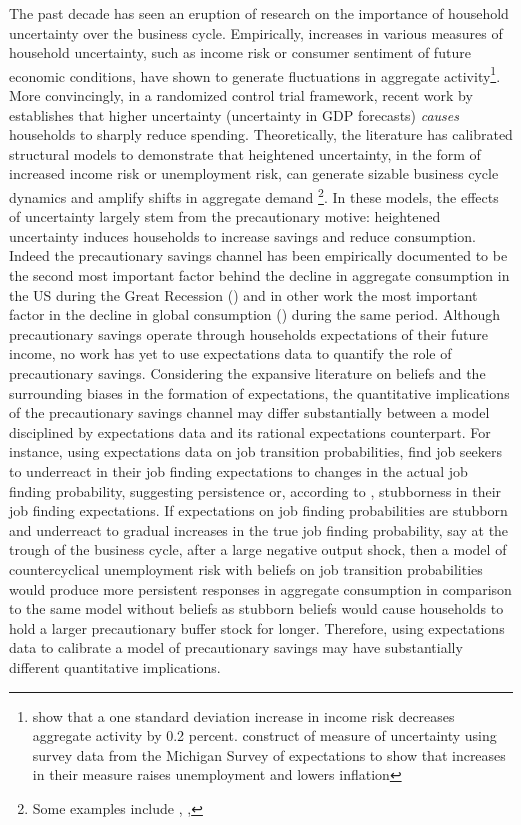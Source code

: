 \documentclass[titlepage]{\econtex}\providecommand{\texname}{Dissertation-Proposal}
\begin{document}
The past decade has seen an eruption of research on the importance of household uncertainty over the business cycle. Empirically, increases in various measures of household uncertainty, such as income risk or consumer sentiment of future economic conditions, have shown to generate fluctuations in aggregate activity\footnote{\cite{bayer2019precautionary} show that a one standard deviation increase in income risk decreases aggregate activity by 0.2 percent.  \cite{leduc2016uncertainty} construct of measure of uncertainty using survey data from the Michigan Survey of expectations to show that increases in their measure raises unemployment and lowers inflation}. More convincingly, in a randomized control trial framework, recent work by \cite{coibion2021effect} establishes that higher uncertainty (uncertainty in GDP forecasts) \textit{causes} households to sharply reduce spending.  Theoretically, the literature has calibrated structural models to demonstrate that heightened uncertainty, in the form of increased income risk or unemployment risk, can generate sizable business cycle dynamics and amplify shifts in aggregate demand \footnote{ Some examples include \cite{bayer2019precautionary}, \cite{mckay2017time} ,\cite{ravn2017job}}. In these models, the effects of uncertainty largely stem from the precautionary motive: heightened uncertainty induces households to increase savings and reduce consumption. Indeed the precautionary savings channel has been empirically documented to be the second most important factor behind the decline in aggregate consumption in the US during the Great Recession (\cite{carroll2012dissecting}) and in other work the most important factor in the decline in global consumption (\cite{mody2012precautionary}) during the same period. Although precautionary savings operate through households expectations of their future income, no work has yet to use expectations data to quantify the role of precautionary savings. Considering the expansive literature on beliefs and the surrounding biases in the formation of expectations, the quantitative implications of the precautionary savings channel may differ substantially between a model disciplined by expectations data and its rational expectations counterpart. For instance, using expectations data on job transition probabilities, \cite{mueller2021job} find job seekers to underreact in their job finding expectations to changes in the actual job finding probability, suggesting persistence or, according to \cite{menzio2022stubborn}, stubborness in their job finding expectations.  If expectations on job finding probabilities are stubborn and underreact to gradual increases in the true job finding probability, say at the trough of the business cycle, after a large negative output shock, then a model of countercyclical unemployment risk with beliefs on job transition probabilities would produce more persistent responses in aggregate consumption in comparison to the same model without beliefs as stubborn beliefs would cause households to hold a larger precautionary buffer stock for longer. Therefore, using expectations data to calibrate a model of precautionary savings may have substantially different quantitative implications. \\
\end{document}
